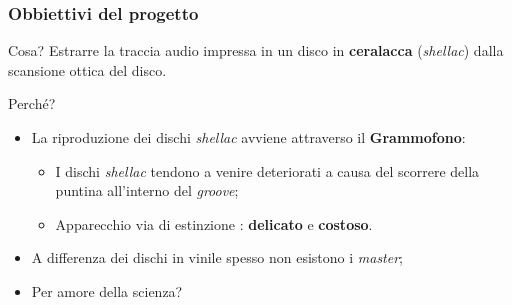 \begin{frame}

\frametitle{Obbiettivi del progetto}

\begin{block}{Cosa?}
Estrarre la traccia audio impressa in un disco in \textbf{ceralacca}
(\emph{shellac}) dalla scansione ottica del disco.
\end{block}

\begin{block}{Perché?}
\begin{itemize}
\item La riproduzione dei dischi \emph{shellac} avviene attraverso il \textbf{Grammofono}:
	\begin{itemize}
	\item I dischi \emph{shellac} tendono a venire deteriorati a causa del
	scorrere della puntina all'interno del \emph{groove};
	\item Apparecchio via di estinzione : \textbf{delicato} e \textbf{costoso}.
	\end{itemize}
\item A differenza dei dischi in vinile spesso non  esistono i \emph{master};
\item Per amore della scienza?
\end{itemize}
\end{block}

\end{frame}
